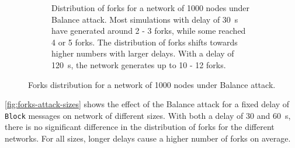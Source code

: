 \begin{figure}[h]
\begin{subfigure}{\textwidth}
		\vspace*{0.25cm}
		\caption{
			Distribution of forks for a network of \num{1000} nodes under Balance attack.
			Most simulations with delay of \SI{30}{\second} have generated around \num{2} - \num{3} forks, while some reached \num{4} or \num{5} forks.
			The distribution of forks shifts towards higher numbers with larger delays.
			With a delay of \SI{120}{\second}, the network generates up to \num{10} - \num{12} forks.
		}
		\vspace*{0.25cm}
	\end{subfigure}
	\caption[Forks distribution for a network of 1000 nodes under Balance attack]{
		Forks distribution for a network of \num{1000} nodes under Balance attack.
	}
	\label{fig:forks-attack-delay-1000}
\end{figure}

\medskip
\cref{fig:forks-attack-sizes} shows the effect of the Balance attack for a fixed delay of \texttt{Block} messages on network of different sizes.
With both a delay of \num{30} and \SI{60}{\second}, there is no significant difference in the distribution of forks for the different networks.
For all sizes, longer delays cause a higher number of forks on average.

